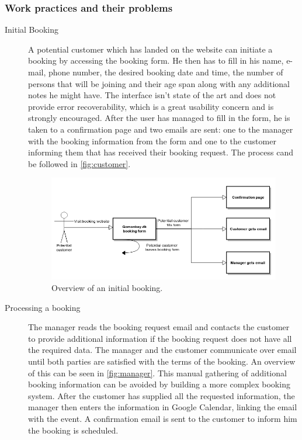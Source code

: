 \subsubsection{Work practices and their problems}

\begin{description}
\item[Initial Booking]
A potential customer which has landed on the website can initiate a booking
by accessing the booking form. He then has to fill in his name, e-mail, phone number, 
the desired booking date and time, the number of persons that will be joining and their
age span along with any additional notes he might have. The interface isn't state of the art 
and does not provide error recoverability, which is a great usability concern and is 
strongly encouraged. After the user has managed to fill in the form, he is taken to a confirmation
page and two emails are sent: one to the manager with the booking information from the form and
one to the customer informing them that \gomonkey{} has received their booking request. The process
cand be followed in \autoref{fig:customer}.

\begin{figure}[htbp]
    \centering
        \includegraphics[width=\textwidth]{figures/customer.png}
            \caption{Overview of an initial booking.}
        \label{fig:customer}
\end{figure}

\item[Processing a booking]
The manager reads the booking request email and contacts the customer to provide additional
information if the booking request does not have all the required data. The manager and the 
customer communicate over email until both parties are satisfied with the terms of the booking.
An overview of this can be seen in \autoref{fig:manager}. This manual gathering of additional
booking information can be avoided by building a more complex booking system. After the customer
has supplied all the requested information, the manager then enters the information in Google
Calendar, linking the email with the event. A confirmation email is sent to the customer to
inform him the booking is scheduled.


\end{description}
